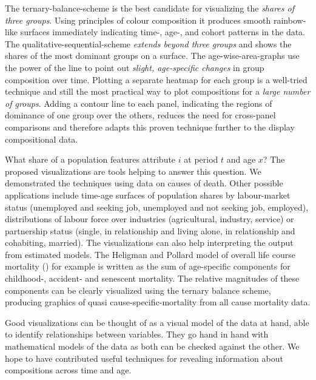 \documentclass[a4paper]{scrartcl}
\begin{document}
The ternary-balance-scheme is the best candidate for visualizing the \emph{shares of three groups}. Using principles of colour composition it produces smooth rainbow-like surfaces immediately indicating time-, age-, and cohort patterns in the data. The qualitative-sequential-scheme \emph{extends beyond three groups} and shows the shares of the most dominant groups on a surface. The age-wise-area-graphs use the power of the line to point out \emph{slight, age-specific changes} in group composition over time. Plotting a separate heatmap for each group is a well-tried technique and still the most practical way to plot compositions for a \emph{large number of groups}. Adding a contour line to each panel, indicating the regions of dominance of one group over the others, reduces the need for cross-panel comparisons and therefore adapts this proven technique further to the display compositional data.

What share of a population features attribute $i$ at period $t$ and age $x$? The proposed visualizations are tools helping to answer this question. We demonstrated the techniques using data on causes of death. Other possible applications include time-age surfaces of population shares by labour-market status (unemployed and seeking job, unemployed and not seeking job, employed), distributions of labour force over industries (agricultural, industry, service) or partnership status (single, in relationship and living alone, in relationship and cohabiting, married). The visualizations can also help interpreting the output from estimated models. The Heligman and Pollard model of overall life course mortality (\cite{Heligman1980}) for example is written as the sum of age-specific components for childhood-, accident- and senescent mortality. The relative magnitudes of these components can be clearly visualized using the ternary balance scheme, producing graphics of quasi cause-specific-mortality from all cause mortality data.

Good visualizations can be thought of as a visual model of the data at hand, able to identify relationships between variables. They go hand in hand with mathematical models of the data as both can be checked against the other. We hope to have contributed useful techniques for revealing information about compositions across time and age.

\clearpage


\sloppy
\printbibliography
\end{document}
